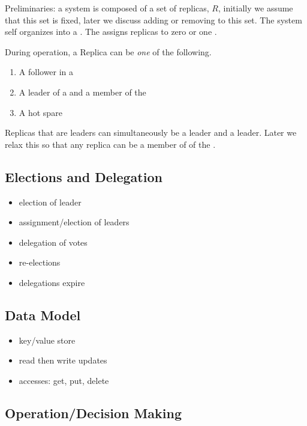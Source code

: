 \documentclass[10pt,twocolumn]{article}
\begin{document}
Preliminaries: a system is composed of a set of replicas, $R$, initially we
assume that this set is fixed, later we discuss adding or removing to this
set.
The system self organizes into a \roo.
The \roo assigns replicas to zero or one \subs.

During operation, a Replica can be \emph{one} of the following.

\begin{enumerate}
    \item A follower in a \sub
    \item A leader of a \sub and a member of the \roo
    \item A hot spare
\end{enumerate}

Replicas that are leaders can simultaneously be a \sub leader and a \roo
leader.
Later we relax this so that any replica can be a member of of the \roo.

\subsection*{Elections and Delegation}

\begin{itemize}
    \item election of \roo leader
    \item assignment/election of \sub leaders
    \item delegation of votes
    \item re-elections
    \item delegations expire
\end{itemize}

\subsection*{Data Model}


\begin{itemize}
    \item key/value store
    \item read then write updates
    \item accesses: get, put, delete
\end{itemize}

\subsection*{Operation/Decision Making}
\end{document}
